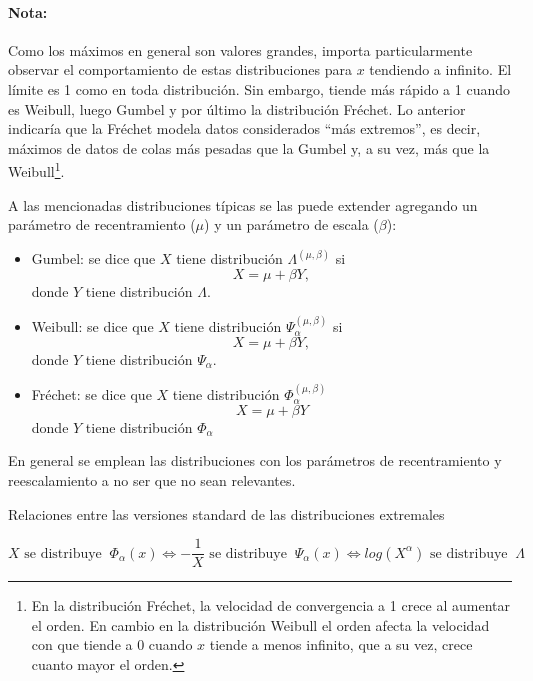 \documentclass[
  12pt]{article}
\begin{document}
\paragraph*{Nota:}

Como los máximos en general son valores grandes, importa particularmente
observar el comportamiento de estas distribuciones para \(x\) tendiendo
a infinito. El límite es 1 como en toda distribución. Sin embargo,
tiende más rápido a 1 cuando es Weibull, luego Gumbel y por último la
distribución Fréchet. Lo anterior indicaría que la Fréchet modela datos
considerados ``más extremos'', es decir, máximos de datos de colas más
pesadas que la Gumbel y, a su vez, más que la
Weibull\footnote{En la distribución Fréchet, la velocidad de convergencia a 1 crece al aumentar el orden. En cambio en la distribución Weibull el orden afecta la velocidad con que tiende a 0 cuando $x$ tiende a menos infinito, que a su vez, crece cuanto mayor el orden.}.

A las mencionadas distribuciones típicas se las puede extender agregando
un parámetro de recentramiento (\(\mu\)) y un parámetro de escala
(\(\beta\)):

\begin{itemize}
\item Gumbel: se dice que $X$ tiene distribución $\Lambda^{(\mu,\beta)}$ si
\begin{equation}
X=\mu+\beta Y,
\end{equation}
donde $Y$ tiene distribución $\Lambda$.

\item Weibull: se dice que $X$ tiene distribución $\Psi_{\alpha}^{(\mu,\beta)}$ si 
\begin{equation}
X=\mu+\beta Y,
\end{equation}
donde $Y$ tiene distribución $\Psi_{\alpha}$.

\item  Fréchet: se dice que $X$ tiene distribución $\Phi_{\alpha}^{(\mu,\beta)}$ 
\begin{equation}
X=\mu+\beta Y
\end{equation}
donde $Y$ tiene distribución $\Phi_{\alpha}$
\end{itemize}

En general se emplean las distribuciones con los parámetros de
recentramiento y reescalamiento a no ser que no sean relevantes.

\begin{theorem} Relaciones entre las versiones standard de las distribuciones extremales

$$
X\text{ se distribuye }\:\Phi_{\alpha}(x) \iff -\frac{1}{X}\text{ se distribuye }\:\Psi_{\alpha}(x) \iff log(X^{\alpha})\text{ se distribuye }\:\Lambda
$$
\end{theorem}
\end{document}
